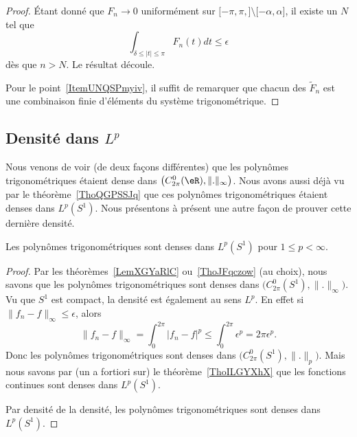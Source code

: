 \begin{proof}
    Étant donné que \( F_n\to 0\) uniformément sur \( \mathopen[ -\pi,\pi ,  \mathclose]\setminus\mathopen[ -\alpha , \alpha \mathclose]\), il existe un \( N\) tel que
    \begin{equation}
        \int_{\delta\leq| t |\leq \pi}F_n(t)dt\leq \epsilon
    \end{equation}
    dès que \( n>N\). Le résultat découle.

    Pour le point~\ref{ItemUNQSPmyiv}, il suffit de remarquer que chacun des \( \tilde F_n\) est une combinaison finie d'éléments du système trigonométrique.
\end{proof}


\subsection{Densité dans \texorpdfstring{$ L^p$}{Lp}}

Nous venons de voir (de deux façons différentes) que les polynômes trigonométriques étaient dense dans \( \big( C^0_{2\pi}(\eR),\| . \|_{\infty} \big)\). Nous avons aussi déjà vu par le théorème~\ref{ThoQGPSSJq} que ces polynômes trigonométriques étaient denses dans \( L^p(S^1)\). Nous présentons à présent une autre façon de prouver cette dernière densité.

\begin{theorem}     \label{ThoDPTwimI}
    Les polynômes trigonométriques sont denses dans \( L^p(S^1)\) pour \( 1\leq p <\infty\).
\end{theorem}

\begin{proof}
    Par les théorèmes~\ref{LemXGYaRlC} ou~\ref{ThoJFqczow} (au choix), nous savons que les polynômes trigonométriques sont denses dans \( \big( C^0_{2\pi}(S^1),\| . \|_{\infty} \big)\). Vu que \( S^1\) est compact, la densité est également au sens \( L^p\). En effet si \( \| f_n-f \|_{\infty}\leq \epsilon\), alors
    \begin{equation}
        \| f_n-f \|_{\infty}=\int_0^{2\pi}| f_n-f |^p\leq\int_0^{2\pi}\epsilon^p=2\pi\epsilon^p.
    \end{equation}
    Donc les polynômes trigonométriques sont denses dans \( \big( C^0_{2\pi}(S^1),\| . \|_p \big)\). Mais nous savons par (un a fortiori sur) le théorème~\ref{ThoILGYXhX} que les fonctions continues sont denses dans \( L^p(S^1)\).

    Par densité de la densité, les polynômes trigonométriques sont denses dans \( L^p(S^1)\).
\end{proof}

